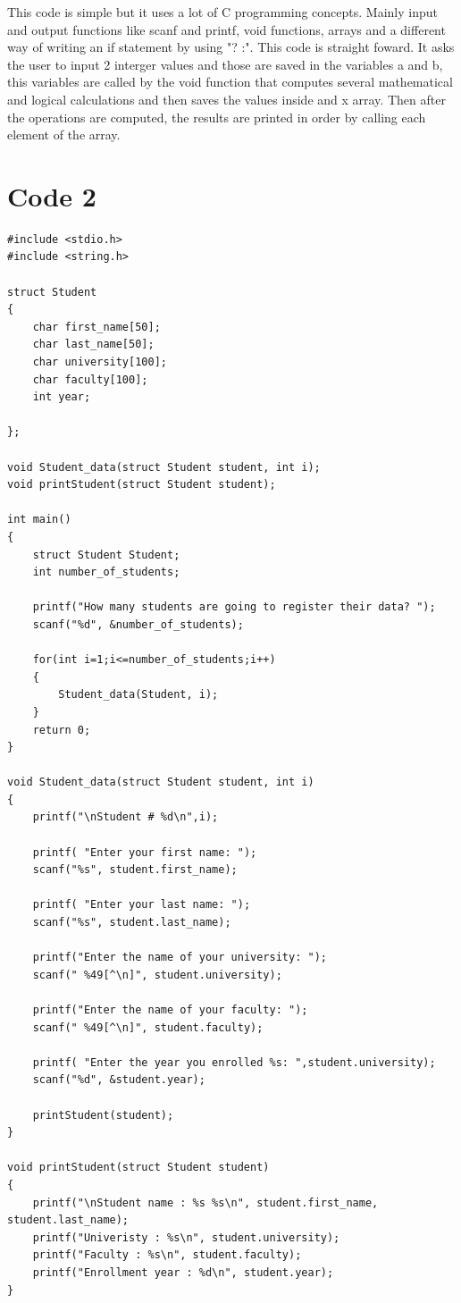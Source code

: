 \documentclass[12pt, letterpaper]{article}
\begin{document}
  This code is simple but it uses a lot of C programming concepts. Mainly input and output functions like scanf and printf, void functions, arrays and
  a different way of writing an if statement by using "? :". This code is straight foward. It asks the user to input 2 interger values and those are
  saved in the variables a and b, this variables are called by the void function that computes several mathematical and logical calculations and then saves
  the values inside and x array. Then after the operations are computed, the results are printed in order by calling each element of the array.

\section*{\large Code 2}
\begin{lstlisting}
#include <stdio.h>
#include <string.h>
 
struct Student 
{
    char first_name[50];
    char last_name[50];
    char university[100];
    char faculty[100];
    int year;

};

void Student_data(struct Student student, int i);
void printStudent(struct Student student);

int main() 
{
    struct Student Student;
    int number_of_students;

    printf("How many students are going to register their data? ");
    scanf("%d", &number_of_students);

    for(int i=1;i<=number_of_students;i++)
    {
        Student_data(Student, i);
    }
    return 0;
}

void Student_data(struct Student student, int i)
{
    printf("\nStudent # %d\n",i);

    printf( "Enter your first name: ");
    scanf("%s", student.first_name);

    printf( "Enter your last name: ");
    scanf("%s", student.last_name);

    printf("Enter the name of your university: ");
    scanf(" %49[^\n]", student.university);

    printf("Enter the name of your faculty: ");
    scanf(" %49[^\n]", student.faculty);

    printf( "Enter the year you enrolled %s: ",student.university);
    scanf("%d", &student.year);

    printStudent(student);
}

void printStudent(struct Student student) 
{
    printf("\nStudent name : %s %s\n", student.first_name, student.last_name);
    printf("Univeristy : %s\n", student.university);
    printf("Faculty : %s\n", student.faculty);
    printf("Enrollment year : %d\n", student.year);
}

\end{lstlisting}
\end{document}
